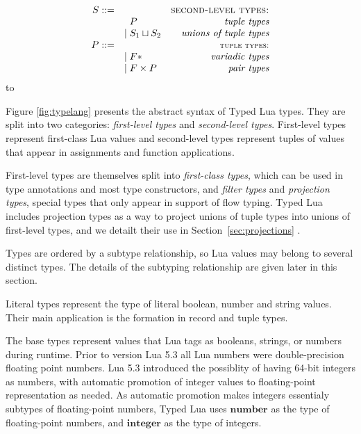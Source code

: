 \documentclass{sigplanconf}
\newcommand{\Nil}{\mathbf{nil}}
\newcommand{\Integer}{\mathbf{integer}}
\newcommand{\Number}{\mathbf{number}}
\newcommand{\Void}{\Nil{*}}
\def\dend{\hbox to \hsize{\vrule height 4pt\hrulefill\vrule height 4pt}}
\begin{document}
\begin{figure*}[!ht]
$$\begin{array}{rlr}
S ::= & & \textsc{second-level types:}\\
& \;\; P & \textit{tuple types}\\
& | \; S_{1} \sqcup S_{2} & \textit{unions of tuple types}\\
P ::= & & \textsc{{\small tuple types:}}\\
& | \; F{*} & \textit{variadic types}\\
& | \; F \times P & \textit{pair types}
\end{array}
$$
\dend
\caption{The abstract syntax of Typed Lua types}
\label{fig:typelang}
\end{figure*}

Figure \ref{fig:typelang} presents the abstract syntax of
Typed Lua types. They are split into two categories:
\emph{first-level types} and \emph{second-level types}.
First-level types represent first-class Lua values and
second-level types represent tuples of values that appear in 
assignments and function applications. 

First-level types are
themselves split into {\em first-class types}, which can be
used in type annotations and most type constructors, and
{\em filter types} and {\em projection types}, special
types that only appear in support of flow typing.
Typed Lua includes projection types as a way to project
unions of tuple types into unions of first-level types,
and we detailt their use in Section~\ref{sec:projections} .

Types are ordered by a subtype relationship, so Lua values may belong to several distinct types. The details of the subtyping
relationship are given later in this section.

Literal types represent the type of literal boolean, number
and string values. Their main application is the formation in record and tuple types.

The base types represent values that Lua tags as booleans,
strings, or numbers during runtime. Prior to version Lua 5.3 all Lua numbers were double-precision floating point numbers.
Lua 5.3 introduced the possiblity of having 64-bit integers
as numbers, with automatic promotion of integer values to
floating-point representation as needed. As automatic
promotion makes integers essentialy subtypes of floating-point numbers, Typed Lua uses $\Number$ as the type of floating-point numbers, and $\Integer$ as the type of integers.
\end{document}
